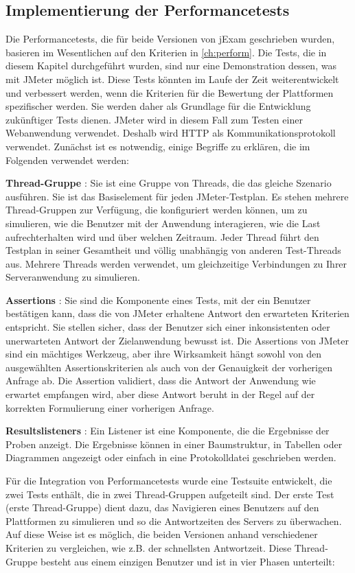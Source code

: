 \subsection{Implementierung der Performancetests}

Die Performancetests, die für beide Versionen von jExam geschrieben wurden,
basieren im Wesentlichen auf den Kriterien in  \autoref{ch:perform}. Die Tests, die
in diesem Kapitel durchgeführt wurden, sind nur eine Demonstration
dessen, was mit JMeter möglich ist. Diese Tests könnten im Laufe der Zeit
weiterentwickelt und verbessert werden, wenn die Kriterien für die Bewertung
der Plattformen spezifischer werden. Sie werden daher als Grundlage für die
Entwicklung zukünftiger Tests dienen. JMeter wird in diesem Fall zum Testen
einer Webanwendung verwendet. Deshalb wird HTTP als Kommunikationsprotokoll
verwendet. Zunächst ist es notwendig, einige Begriffe zu erklären, die im
Folgenden verwendet werden:

\textbf{Thread-Gruppe} : Sie ist eine Gruppe von Threads, die das gleiche
Szenario ausführen. Sie ist das Basiselement für jeden JMeter-Testplan. Es
stehen mehrere Thread-Gruppen zur Verfügung, die konfiguriert werden können,
um zu simulieren, wie die Benutzer mit der Anwendung interagieren, wie die
Last aufrechterhalten wird und über welchen Zeitraum. Jeder Thread führt
den Testplan in seiner Gesamtheit und völlig unabhängig von anderen
Test-Threads aus. Mehrere Threads werden verwendet, um gleichzeitige
Verbindungen zu Ihrer Serveranwendung zu simulieren.

\textbf{Assertions} : Sie sind die Komponente eines Tests, mit der ein
Benutzer bestätigen kann, dass die von JMeter erhaltene Antwort den
erwarteten Kriterien entspricht. Sie stellen sicher, dass der Benutzer sich
einer inkonsistenten oder unerwarteten Antwort der Zielanwendung bewusst
ist. Die Assertions von JMeter sind ein mächtiges Werkzeug, aber ihre
Wirksamkeit hängt sowohl von den ausgewählten Assertionskriterien als auch
von der Genauigkeit der vorherigen Anfrage ab. Die Assertion validiert, dass
die Antwort der Anwendung wie erwartet empfangen wird, aber diese Antwort
beruht in der Regel auf der korrekten Formulierung einer vorherigen Anfrage.


\textbf{Resultslisteners} : Ein Listener ist eine Komponente, die die
Ergebnisse der Proben anzeigt. Die Ergebnisse können in einer Baumstruktur,
in Tabellen oder Diagrammen angezeigt oder einfach in eine Protokolldatei
geschrieben werden.


Für die Integration von Performancetests wurde eine Testsuite entwickelt,
die zwei Tests enthält, die in zwei Thread-Gruppen aufgeteilt sind. Der erste
Test (erste Thread-Gruppe) dient dazu, das Navigieren eines Benutzers auf den
Plattformen zu simulieren und so die Antwortzeiten des Servers zu überwachen.
Auf diese Weise ist es möglich, die beiden Versionen anhand verschiedener
Kriterien zu vergleichen, wie z.B. der schnellsten Antwortzeit. Diese
Thread-Gruppe besteht aus einem einzigen Benutzer und ist in vier Phasen
unterteilt:


